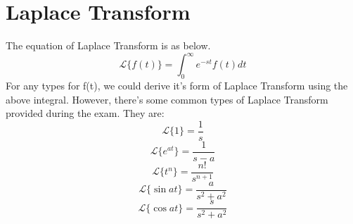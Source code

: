 \documentclass{article}
\begin{document}
\section{Laplace Transform}
The equation of Laplace Transform is as below.
\begin{equation*}
	\mathcal{L}\{f(t)\} = \int_{0}^{\infty }e^{-st}f(t)dt
\end{equation*}
For any types for f(t), we could derive it's form of Laplace Transform using the above integral. However, there's some common types of Laplace Transform provided during the exam. They are:
\begin{equation*}
	\mathcal{L}\{1\} = \frac{1}{s}
\end{equation*}
\begin{equation*}
	\mathcal{L}\{e^{at}\} = \frac{1}{s-a}
\end{equation*}
\begin{equation*}
	\mathcal{L}\{t^n\} = \frac{n!}{s^{n+1}}
\end{equation*}
\begin{equation*}
	\mathcal{L}\{\sin {at}\} = \frac {a} {s^2 + a^2}
\end{equation*}
\begin{equation*}
	\mathcal{L}\{\cos {at}\} = \frac {s} {s^2 + a^2}
\end{equation*}
\end{document}

